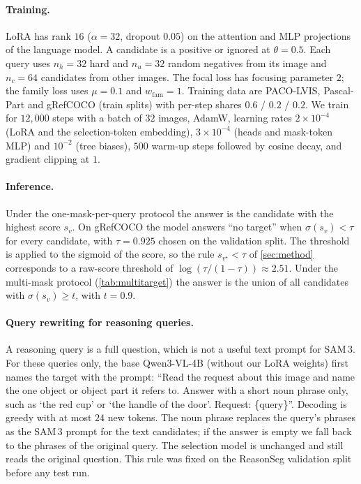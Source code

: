 

\paragraph{Training.}
LoRA has rank $16$ ($\alpha=32$, dropout $0.05$) on the attention and MLP projections of the language model. A
candidate is a positive or ignored at $\theta=0.5$. Each query uses $n_h=32$ hard and $n_u=32$ random negatives from
its image and $n_c=64$ candidates from other images. The focal loss has focusing parameter $2$; the family loss uses
$\mu=0.1$ and $w_{\mathrm{fam}}=1$. Training data are PACO-LVIS, Pascal-Part and gRefCOCO (train splits) with
per-step shares $0.6$ / $0.2$ / $0.2$. We train for $12{,}000$ steps with a batch of $32$ images, AdamW, learning
rates $2\times10^{-4}$ (LoRA and the selection-token embedding), $3\times10^{-4}$ (heads and mask-token MLP) and $10^{-2}$ (tree
biases), $500$ warm-up steps followed by cosine decay, and gradient clipping at $1$.

\paragraph{Inference.}
Under the one-mask-per-query protocol the answer is the candidate with the highest score $s_v$. On gRefCOCO the
model answers ``no target'' when $\sigma(s_v)<\tau$ for every candidate, with $\tau=0.925$ chosen on the validation
split. The threshold is applied to the sigmoid of the score, so the rule $s_{v^\star}<\tau$ of
\cref{sec:method} corresponds to a raw-score threshold of $\log(\tau/(1-\tau))\approx2.51$. Under the multi-mask protocol (\cref{tab:multitarget}) the answer is the union of all candidates with
$\sigma(s_v)\geq t$, with $t=0.9$.

\paragraph{Query rewriting for reasoning queries.}
A reasoning query is a full question, which is not a useful text prompt for SAM\,3. For these queries only, the
base Qwen3-VL-4B (without our LoRA weights) first names the target with the prompt: ``Read the request about this
image and name the one object or object part it refers to. Answer with a short noun phrase only, such as `the red
cup' or `the handle of the door'. Request: \{query\}''. Decoding is greedy with at most $24$ new tokens. The noun
phrase replaces the query's phrases as the SAM\,3 prompt for the text candidates; if the answer is empty we fall
back to the phrases of the original query. The selection model is unchanged and still reads the original question.
This rule was fixed on the ReasonSeg validation split before any test run.


